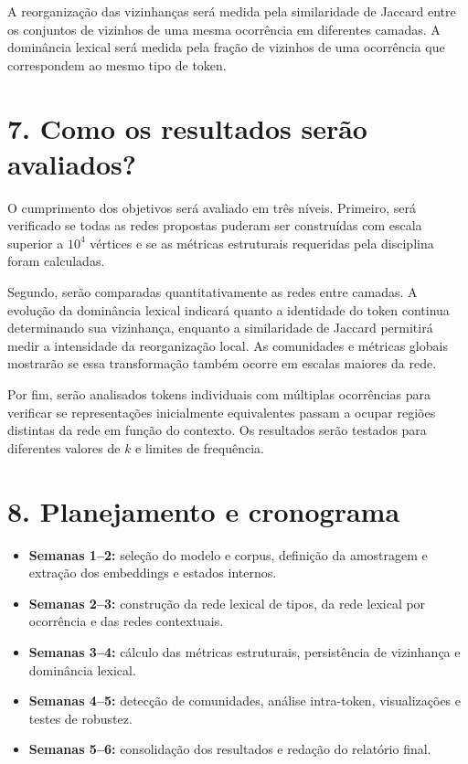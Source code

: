 \documentclass[11pt,a4paper]{article}
\begin{document}
A reorganização das vizinhanças será medida pela similaridade de Jaccard entre
os conjuntos de vizinhos de uma mesma ocorrência em diferentes camadas. A
dominância lexical será medida pela fração de vizinhos de uma
ocorrência que correspondem ao mesmo tipo de token.

\section*{7. Como os resultados serão avaliados?}

O cumprimento dos objetivos será avaliado em três níveis. Primeiro, será
verificado se todas as redes propostas puderam ser construídas com escala
superior a $10^4$ vértices e se as métricas estruturais requeridas pela
disciplina foram calculadas.

Segundo, serão comparadas quantitativamente as redes entre camadas. A evolução
da dominância lexical indicará quanto a identidade do token continua
determinando sua vizinhança, enquanto a similaridade de Jaccard permitirá medir
a intensidade da reorganização local. As comunidades e métricas globais
mostrarão se essa transformação também ocorre em escalas maiores da rede.

Por fim, serão analisados tokens individuais com múltiplas ocorrências para
verificar se representações inicialmente equivalentes passam a ocupar regiões
distintas da rede em função do contexto. Os resultados serão testados para
diferentes valores de $k$ e limites de frequência.

\section*{8. Planejamento e cronograma}

\begin{itemize}

    \item \textbf{Semanas 1--2:} seleção do modelo e corpus, definição da
    amostragem e extração dos embeddings e estados internos.

    \item \textbf{Semanas 2--3:} construção da rede lexical de tipos, da rede
    lexical por ocorrência e das redes contextuais.

    \item \textbf{Semanas 3--4:} cálculo das métricas estruturais, persistência
    de vizinhança e dominância lexical.

    \item \textbf{Semanas 4--5:} detecção de comunidades, análise intra-token,
    visualizações e testes de robustez.

    \item \textbf{Semanas 5--6:} consolidação dos resultados e redação do
    relatório final.

\end{itemize}
\end{document}
